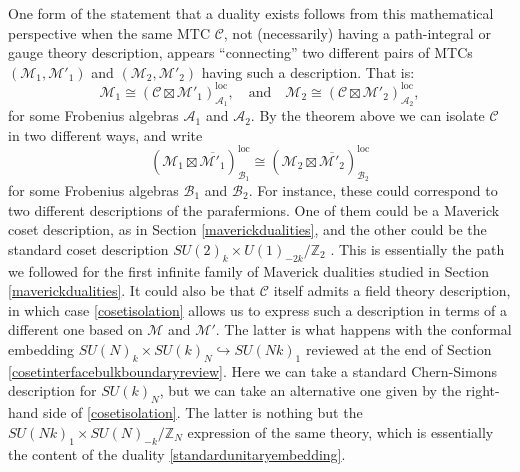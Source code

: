 \documentclass[11pt]{article}
\numberwithin{equation}{section}
\begin{document}
One form of the statement that a duality exists follows from this mathematical perspective when the same MTC $\mathcal{C}$, not (necessarily) having a path-integral or gauge theory description, appears ``connecting'' two different pairs of MTCs $(\mathcal{M}_{1},\mathcal{M}'_{1})$ and $(\mathcal{M}_{2}, \mathcal{M}'_{2})$ having such a description. That is:
\begin{equation}
    \mathcal{M}_{1} \cong (\mathcal{C} \boxtimes \mathcal{M}'_{1})^{\mathrm{loc}}_{\mathcal{A}_{1}}, \quad \mathrm{and} \quad \mathcal{M}_{2} \cong (\mathcal{C} \boxtimes \mathcal{M}'_{2})^{\mathrm{loc}}_{\mathcal{A}_{2}},
\end{equation}
for some Frobenius algebras $\mathcal{A}_{1}$ and $\mathcal{A}_{2}$. By the theorem above we can isolate $\mathcal{C}$ in two different ways, and write
\begin{equation}
    (\mathcal{M}_{1} \boxtimes \overline{\mathcal{M}'_{1}})^{\mathrm{loc}}_{\mathcal{B}_{1}} \cong (\mathcal{M}_{2} \boxtimes \overline{\mathcal{M}'_{2}})^{\mathrm{loc}}_{\mathcal{B}_{2}}
\end{equation}
for some Frobenius algebras $\mathcal{B}_{1}$ and $\mathcal{B}_{2}$. For instance, these could correspond to two different descriptions of the parafermions. One of them could be a Maverick coset description, as in Section \ref{maverickdualities}, and the other could be the standard coset description $SU(2)_{k} \times U(1)_{-2k}/\mathbb{Z}_{2}$ \cite{DiFrancesco:1997nk}. This is essentially the path we followed for the first infinite family of Maverick dualities studied in Section \ref{maverickdualities}. It could also be that $\mathcal{C}$ itself admits a field theory description, in which case \eqref{cosetisolation} allows us to express such a description in terms of a different one based on $\mathcal{M}$ and $\mathcal{M}'$. The latter is what happens with the conformal embedding $SU(N)_{k} \times SU(k)_{N} \hookrightarrow SU(Nk)_{1}$ reviewed at the end of Section \ref{cosetinterfacebulkboundaryreview}. Here we can take a standard Chern-Simons description for $SU(k)_{N}$, but we can take an alternative one given by the right-hand side of \eqref{cosetisolation}. The latter is nothing but the $SU(Nk)_{1} \times SU(N)_{-k} / \mathbb{Z}_{N}$ expression of the same theory, which is essentially the content of the duality \eqref{standardunitaryembedding}.
\end{document}
